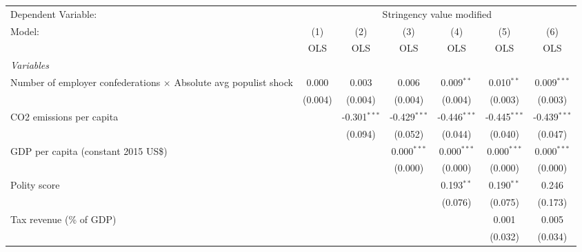 
\begingroup
\centering
\begin{tabular}{lcccccc}
   \toprule
   Dependent Variable: & \multicolumn{6}{c}{Stringency value modified}\\
   Model:                                                                  & (1)     & (2)            & (3)            & (4)            & (5)            & (6)\\  
                                                                           &  OLS    & OLS            & OLS            & OLS            & OLS            & OLS\\  
   \midrule
   \emph{Variables}\\
   Number of employer confederations $\times$ Absolute avg populist shock  & 0.000   & 0.003          & 0.006          & 0.009$^{**}$   & 0.010$^{**}$   & 0.009$^{***}$\\   
                                                                           & (0.004) & (0.004)        & (0.004)        & (0.004)        & (0.003)        & (0.003)\\   
   CO2 emissions per capita                                                &         & -0.301$^{***}$ & -0.429$^{***}$ & -0.446$^{***}$ & -0.445$^{***}$ & -0.439$^{***}$\\   
                                                                           &         & (0.094)        & (0.052)        & (0.044)        & (0.040)        & (0.047)\\   
   GDP per capita (constant 2015 US\$)                                     &         &                & 0.000$^{***}$  & 0.000$^{***}$  & 0.000$^{***}$  & 0.000$^{***}$\\   
                                                                           &         &                & (0.000)        & (0.000)        & (0.000)        & (0.000)\\   
   Polity score                                                            &         &                &                & 0.193$^{**}$   & 0.190$^{**}$   & 0.246\\   
                                                                           &         &                &                & (0.076)        & (0.075)        & (0.173)\\   
   Tax revenue (\% of GDP)                                                 &         &                &                &                & 0.001          & 0.005\\   
                                                                           &         &                &                &                & (0.032)        & (0.034)\\   

\end{tabular}
